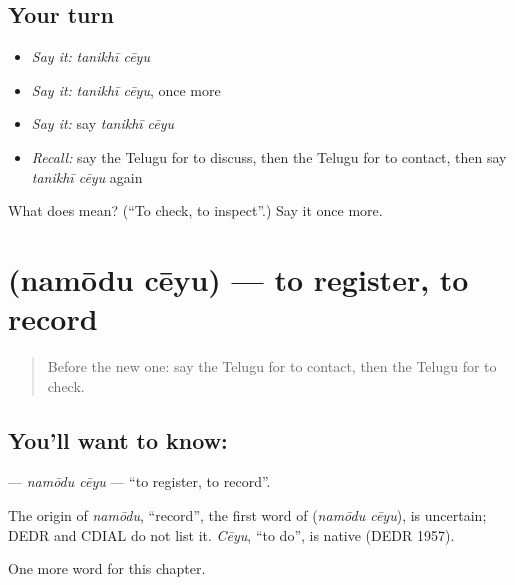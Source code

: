 \subsection*{Your turn}
\begin{itemize}
\raggedright
  \item \emph{Say it:} \emph{tanikhī cēyu}
  \item \emph{Say it:} \emph{tanikhī cēyu}, once more
  \item \emph{Say it:} say \emph{tanikhī cēyu}
  \item \emph{Recall:} say the Telugu for to discuss, then the Telugu for to contact, then say \emph{tanikhī cēyu} again
\end{itemize}

\begin{tcolorbox}[breakable,colback=teal!4,colframe=teal!35!black,title={Before you move on}]
What does   mean? (\textquotedblleft{}To check, to inspect\textquotedblright{}.) Say it once more.
\end{tcolorbox}
\section[\texorpdfstring{\te{నమోదు} \te{చేయు} (namōdu cēyu)}{నమోదు చేయు (namōdu cēyu)}]{  (namōdu cēyu) — to register, to record}

\label{lesson:TE-C202-namodu-ceyu}



\begin{quote}
Before the new one: say the Telugu for to contact, then the Telugu for to check.
\end{quote}

\subsection*{You'll want to know:  }
\textbf{ } — \emph{namōdu cēyu} — \textquotedblleft{}to register, to record\textquotedblright{}.

\begin{cousinweb}
The origin of \emph{namōdu}, \textquotedblleft{}record\textquotedblright{}, the first word of \textbf{ } (\emph{namōdu cēyu}), is uncertain; DEDR and CDIAL do not list it. \emph{Cēyu}, \textquotedblleft{}to do\textquotedblright{}, is native (DEDR 1957).
\end{cousinweb}

\begin{grammarlens}[title={What you've built}]
One more word for this chapter.
\end{grammarlens}

